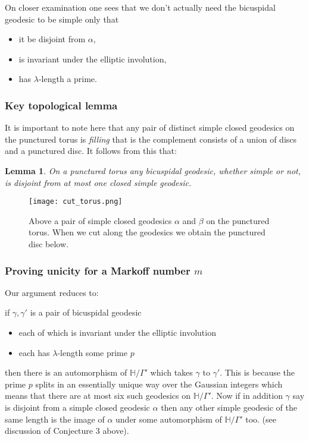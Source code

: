 \documentclass[12pt,a4paper]{amsart}
\newtheorem{lem}[thm]{Lemma}
\def\HH{\mathbb{H}}
\def\xx{\HH/\Gamma'}
\begin{document}
\noindent
On closer examination one sees that we don't actually need the bicuspidal
geodesic to be simple only that 
\begin{itemize}
	\item it be disjoint from $\alpha$,
	\item is invariant under the elliptic involution, 
	\item has $\lambda$-length a prime.
\end{itemize}


\subsubsection{Key topological lemma}
It is important to note here that any pair of
distinct simple closed geodesics on the punctured torus is \textit{filling}
that is the complement consists of a union of discs and a punctured disc. It
follows from this that:

\begin{lem}\label{lem: labelling}
On a punctured torus any bicuspidal geodesic, whether simple or not, is
disjoint from at most one closed simple geodesic.
\end{lem}

\begin{figure}[ht]
\begin{center}
\texttt{[image: cut\_torus.png]}
\end{center}

\caption{Above a pair of simple closed geodesics $\alpha$ and $\beta$ on the
punctured torus. When we cut along the geodesics we obtain the punctured disc
below.}

	\label{fig: cut torus}
\end{figure}

\subsubsection{Proving unicity for a Markoff number $m$} \label{sec:proof}
Our argument reduces to:

if $\gamma, \gamma'$ is a pair of  bicuspidal geodesic 

\begin{itemize}	
\item each of which is invariant under the elliptic involution 
\item each has  $\lambda$-length some prime $p$ 
\end{itemize}	

then there is an automorphism of $\xx$ which takes $\gamma$ to $\gamma'$. This
is because  the prime $p$ splits in an essentially unique way over the Gaussian
integers which means that there are at most six such geodesics on $\xx$. Now if
in addition $\gamma$ say is disjoint from a simple closed geodesic $\alpha$ then
any other simple geodesic of the same length is the image of $\alpha$ under
some automorphism of $\xx$ too. (see discussion of Conjecture 3 \cite{mcp}
above).
\end{document}
